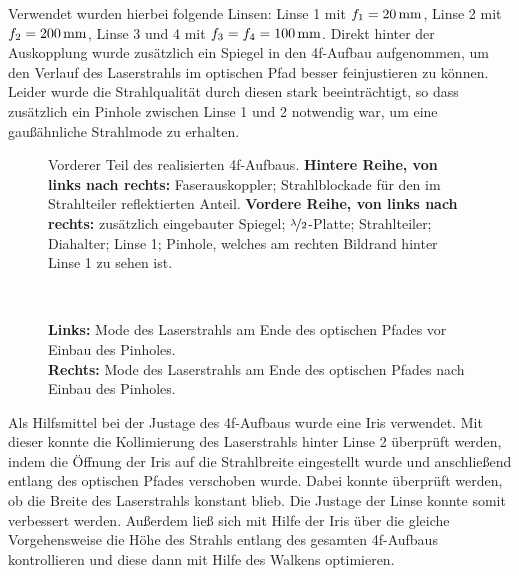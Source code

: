 Verwendet wurden hierbei folgende Linsen: Linse 1 mit $f_{1}=\unit[20]{mm}$, Linse 2 mit $f_{2}=\unit[200]{mm}$, Linse 3 und 4 mit $f_{3}=f_{4}=\unit[100]{mm}$. Direkt hinter der Auskopplung wurde zusätzlich ein Spiegel in den 4f-Aufbau aufgenommen, um den Verlauf des Laserstrahls im optischen Pfad besser feinjustieren zu können. Leider wurde die Strahlqualität durch diesen stark beeinträchtigt, so dass zusätzlich ein Pinhole zwischen Linse 1 und 2 notwendig war, um eine gaußähnliche Strahlmode zu erhalten.\\


\begin{figure}[h]
	\centering
	\caption[Vorderer Teil des 4f-Aufbaus]{
		Vorderer Teil des realisierten 4f-Aufbaus. \textbf{Hintere Reihe, von links nach rechts:} Faserauskoppler; Strahlblockade für den im Strahlteiler reflektierten Anteil. \textbf{Vordere Reihe, von links nach rechts:} zusätzlich eingebauter Spiegel; $\nicefrac{\lambda}{2}$-Platte; Strahlteiler; Diahalter; Linse 1; Pinhole, welches am rechten Bildrand hinter Linse 1 zu sehen ist.
	}
	\label{fig:_DSC7961}
\end{figure}

\begin{figure}[ht]
	\centering
	~
	\caption[Mode vor und nach Verwendung eines Pinholes]{
		\textbf{Links:} Mode des Laserstrahls am Ende des optischen Pfades vor Einbau des Pinholes.\\
		\textbf{Rechts:} Mode des Laserstrahls am Ende des optischen Pfades nach Einbau des Pinholes.
	}
	\label{fig:_DSC7988}
\end{figure}


Als Hilfsmittel bei der Justage des 4f-Aufbaus wurde eine Iris verwendet. Mit dieser konnte die Kollimierung des Laserstrahls hinter Linse 2 überprüft werden, indem die Öffnung der Iris auf die Strahlbreite eingestellt wurde und anschließend entlang des optischen Pfades verschoben wurde. Dabei konnte überprüft werden, ob die Breite des Laserstrahls konstant blieb. Die Justage der Linse konnte somit verbessert werden. Außerdem ließ sich mit Hilfe der Iris über die gleiche Vorgehensweise die Höhe des Strahls entlang des gesamten 4f-Aufbaus kontrollieren und diese dann mit Hilfe des Walkens optimieren. 

\clearpage


